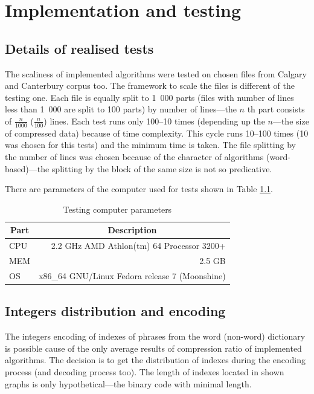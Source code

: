 \documentclass[thesis=M,english]{FITthesis}[2019/12/23]
\begin{document}
\chapter{Implementation and testing}\label{impltest}

\section{Details of realised tests}

The scaliness of implemented algorithms were tested on chosen files from Calgary and Canterbury corpus too. The framework to scale the files is different of the testing one. Each file is equally split to 1~000 parts (files with number of lines less than 1~000 are split to 100 parts) by number of lines---the $n$ th part consists of $\frac{n}{1000}$ ($\frac{n}{100}$) lines. Each test runs only 100--10 times (depending up the $n$---the size of compressed data) because of time complexity. This cycle runs 10--100 times (10 was chosen for this tests) and the minimum time is taken. The file splitting by the number of lines was chosen because of the character of algorithms (word-based)---the splitting by the block of the same size is not so predicative.

There are parameters of the computer used for tests shown in Table \ref{tab:PCparam}.
\begin{table}\centering
	\caption{Testing computer parameters}
	\label{tab:PCparam}
	\begin{tabular}{|l|r|}
	\hline \multicolumn{1}{|c|}{\textbf{Part}} & \multicolumn{1}{|c|}{\textbf{Description}} \\\hline
	CPU & 2.2 GHz AMD Athlon(tm) 64 Processor 3200+\\
	MEM & 2.5 GB\\
	OS & x86\_64 GNU/Linux Fedora release 7 (Moonshine)\\\hline
	\end{tabular}
\end{table}

\section{Integers distribution and encoding}\label{sec:distr}

The integers encoding of indexes of phrases from the word (non-word) dictionary is possible cause of the only average results of compression ratio of implemented algorithms. The decision is to get the distribution of indexes during the encoding process (and decoding process too). The length of indexes located in shown graphs is only hypothetical---the binary code with minimal length.
\end{document}
